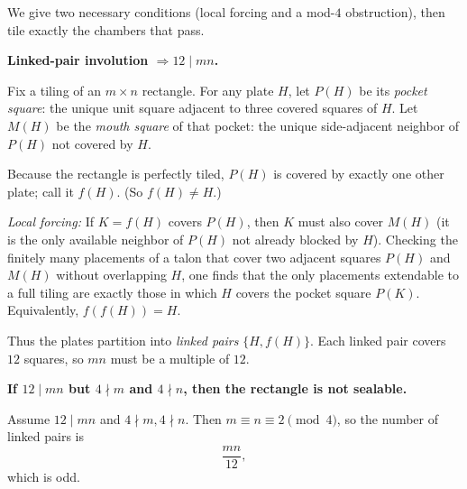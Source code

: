 
\SolutionPage
\scriptsize
We give two necessary conditions (local forcing and a mod-$4$ obstruction), then tile exactly the chambers that pass.

\textbf{Linked-pair involution $\Rightarrow 12\mid mn$.}

Fix a tiling of an $m\times n$ rectangle.
For any plate $H$, let $P(H)$ be its \emph{pocket square}: the unique unit square adjacent to three covered squares of $H$.
Let $M(H)$ be the \emph{mouth square} of that pocket: the unique side-adjacent neighbor of $P(H)$ not covered by $H$.

Because the rectangle is perfectly tiled, $P(H)$ is covered by exactly one other plate; call it $f(H)$.
(So $f(H)\ne H$.)

\noindent\emph{Local forcing:}
If $K=f(H)$ covers $P(H)$, then $K$ must also cover $M(H)$ (it is the only available neighbor of $P(H)$ not already blocked by $H$).
Checking the finitely many placements of a talon that cover two adjacent squares $P(H)$ and $M(H)$ without overlapping $H$,
one finds that the only placements extendable to a full tiling are exactly those in which $H$ covers the pocket square $P(K)$.
Equivalently, $f(f(H))=H$.

Thus the plates partition into \emph{linked pairs} $\{H,f(H)\}$.
Each linked pair covers $12$ squares, so $mn$ must be a multiple of $12$.

\textbf{If $12\mid mn$ but $4\nmid m$ and $4\nmid n$, then the rectangle is not sealable.}

Assume $12\mid mn$ and $4\nmid m,4\nmid n$.
Then $m\equiv n\equiv 2\pmod 4$, so the number of linked pairs is
\[\frac{mn}{12},\]
which is odd.

